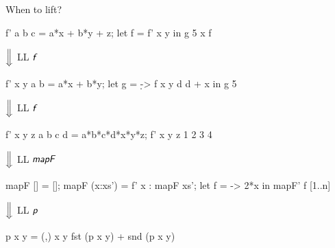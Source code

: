 \documentclass{haskellbeamer}
\newcommand{\id}[1]{\textsf{\textsl{#1}}\xspace}
\newcommand{\idf}{\id{f}}
\begin{document}
\begin{frame}[fragile]{When to lift?}
\begin{center}
\begin{minipage}{0.55\textwidth}
\begin{overprint}
        \begin{haskell}
          f' a b c = a*x + b*y + z;
          let f = f' x y
          in g 5 x f
        \end{haskell}
        \hspace{0.4\textwidth}$\Big\Downarrow$ LL $\idf$
        \begin{haskell}
          f' x y a b = a*x + b*y;
          let g = \d -> f x y d d + x
          in g 5
        \end{haskell}
        \hspace{0.4\textwidth}$\Big\Downarrow$ LL $\idf$
        \begin{haskell}
          f' x y z a b c d = a*b*c*d*x*y*z;
          f' x y z 1 2 3 4
        \end{haskell}
        \hspace{0.4\textwidth}$\Big\Downarrow$ LL $\id{mapF}$
        \begin{haskell}
          mapF []      = [];
          mapF (x:xs') = f' x : mapF xs';
          let f = \x -> 2*x
          in mapF' f [1..n]
        \end{haskell}
        \hspace{0.4\textwidth}$\Big\Downarrow$ LL $\id{p}$
        \begin{haskell}
          p x y = (,) x y
          fst (p x y) + snd (p x y)
        \end{haskell}
      \end{overprint}
    \end{minipage}
  \end{center}
\end{frame}
\end{document}
